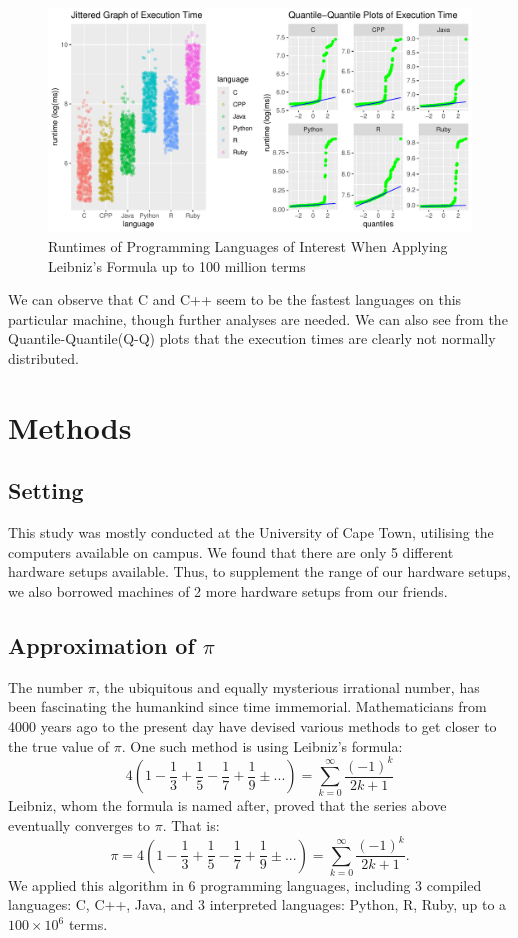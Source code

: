 \documentclass[12pt,halfline,a4paper,]{ouparticle}
\begin{document}
\begin{figure}[H]
\includegraphics[width=1\linewidth]{backup_files/figure-latex/figPrior-1} \caption{Runtimes of Programming Languages of Interest When Applying Leibniz's Formula up to 100 million terms}\label{fig:figPrior}
\end{figure}

We can observe that C and C++ seem to be the fastest languages on this
particular machine, though further analyses are needed. We can also see
from the Quantile-Quantile(Q-Q) plots that the execution times are
clearly not normally distributed. \newpage

\section{Methods}\label{methods}

\subsection{Setting}\label{setting}

This study was mostly conducted at the University of Cape Town,
utilising the computers available on campus. We found that there are
only 5 different hardware setups available. Thus, to supplement the
range of our hardware setups, we also borrowed machines of 2 more
hardware setups from our friends.

\subsection{\texorpdfstring{Approximation of
\(\pi\)}{Approximation of \textbackslash pi}}\label{approximation-of-pi}

The number \(\pi\), the ubiquitous and equally mysterious irrational
number, has been fascinating the humankind since time immemorial.
Mathematicians from 4000 years ago to the present day have devised
various methods to get closer to the true value of \(\pi\). One such
method is using Leibniz's formula: \[
4 \left( 1 - \frac{1}{3} + \frac{1}{5} - \frac{1}{7} + \frac{1}{9} ±... \right) = \sum_{k=0}^{\infty}\frac{(-1)^k}{2k+1}
\] Leibniz, whom the formula is named after, proved that the series
above eventually converges to \(\pi\). That is: \[
\pi = 4 \left( 1 - \frac{1}{3} + \frac{1}{5} - \frac{1}{7} + \frac{1}{9} ±... \right) = \sum_{k=0}^{\infty}\frac{(-1)^k}{2k+1}.
\] We applied this algorithm in 6 programming languages, including 3
compiled languages: C, C++, Java, and 3 interpreted languages: Python,
R, Ruby, up to a \(100 \times 10^6\) terms.
\end{document}
